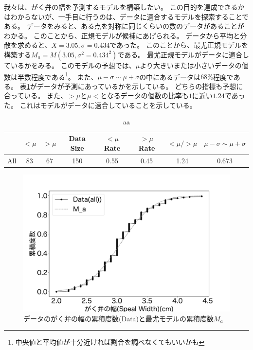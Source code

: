 我々は、がく弁の幅を予測するモデルを構築したい。
この目的を達成できるかはわからないが、一手目に行うのは、データに適合するモデルを探索することである。
データをみると、ある点を対称に同じくらいの数のデータがあることがわかる。
このことから、正規モデルが候補にあげられる。
データから平均と分散を求めると、$\bar{X}=3.05,\sigma=0.434$であった。
このことから、最尤正規モデルを構築する$M_a=M(3.05,\sigma^2=0.434^2)$である。
最尤正規モデルがデータに適合しているかをみる。
このモデルの予想では、$\mu$より大きいまたは小さいデータの個数は半数程度である\footnote{中央値と平均値が十分近ければ割合を調べなくてもいいかも}。
また、$\mu-\sigma \sim \mu+\sigma$の中にあるデータは$68\%$程度である。
表\ref{table:all_spael_width_table}がデータが予測にあっているかを示している。
どちらの指標も予想に合っている。
また、$>\mu$と$\mu<$となるデータの個数の比率も$1$に近い$1.24$であった。
これはモデルがデータに適合していることを示している。
\begin{table}[h]
 \caption{aa}
 \label{table:all_spael_width_table}
 \centering
 \begin{tabular}{lccccccc}
  \hline
  {} &  $<\mu$ &  $>\mu$ &  Data Size &  $<\mu$ Rate &  $>\mu$ Rate &  $<\mu/>\mu$ & $\mu-\sigma\sim\mu+\sigma$\\
  \hline
  All    &    83 &    67 &        150 &       0.55 &       0.45 &       1.24 & 0.673\\
  \hline
 \end{tabular}
\end{table}

\begin{figure}
 \begin{center}
  \includegraphics[width=15cm]{./image/15_/speal_width_all.pdf}
  \caption{データのがく弁の幅の累積度数(Data)と最尤モデルの累積度数$M_a$}
  \label{fig:all_speal_width_fig}
 \end{center}
\end{figure}

